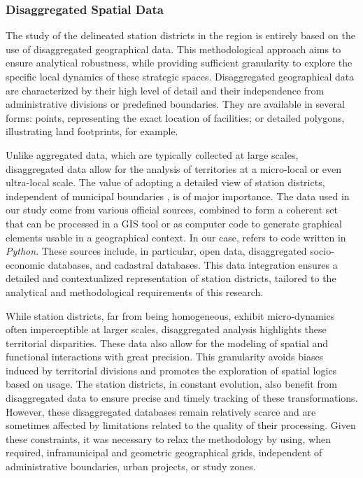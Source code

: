 \begin{refsegment}
\subsubsection*{Disaggregated Spatial Data
    \label{chap3:quartiers-gare-donnees-desagregees}
    }

The study of the delineated station districts in the region is entirely based on the use of disaggregated geographical data. This methodological approach aims to ensure analytical robustness, while providing sufficient granularity to explore the specific local dynamics of these strategic spaces. Disaggregated geographical data are characterized by their high level of detail and their independence from administrative divisions or predefined boundaries. They are available in several forms: points, representing the exact location of facilities; or detailed polygons, illustrating land footprints, for example.%

Unlike aggregated data, which are typically collected at large scales, disaggregated data allow for the analysis of territories at a micro-local or even ultra-local scale. The value of adopting a detailed view of station districts, independent of municipal boundaries 
\textcolor{blue}{\autocite[7]{moretti_interconnexion_1999}}, is of major importance. The data used in our study come from various official sources, combined to form a coherent set that can be processed in a \acrfull{GIS} tool or as computer code to generate graphical elements usable in a geographical context. In our case,  refers to code written in \textsl{Python}. These sources include, in particular, open data, disaggregated socio-economic databases, and cadastral databases. This data integration ensures a detailed and contextualized representation of station districts, tailored to the analytical and methodological requirements of this research.%

While station districts, far from being homogeneous, exhibit micro-dynamics often imperceptible at larger scales, disaggregated analysis highlights these territorial disparities. These data also allow for the modeling of spatial and functional interactions with great precision. This granularity avoids biases induced by territorial divisions and promotes the exploration of spatial logics based on usage. The station districts, in constant evolution, also benefit from disaggregated data to ensure precise and timely tracking of these transformations. However, these disaggregated databases remain relatively scarce and are sometimes affected by limitations related to the quality of their processing. Given these constraints, it was necessary to relax the methodology by using, when required, inframunicipal and geometric geographical grids, independent of administrative boundaries, urban projects, or study zones.%


\end{refsegment}
